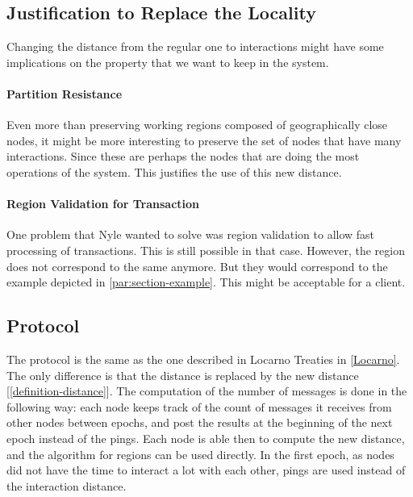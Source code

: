 \documentclass[a4paper,11pt,twoside,openright]{report}
\begin{document}
\subsection{Justification to Replace the Locality}
Changing the distance from the regular one to interactions might have some
implications on the property that we want to keep in the system. 

\paragraph{Partition Resistance}
Even more than preserving working regions
composed of geographically close nodes, it might be more interesting to preserve
the set of nodes that have many interactions. Since these are perhaps the nodes that are doing the most operations of the system. This justifies the use of
this new distance.

\paragraph{Region Validation for Transaction}
One problem that Nyle wanted to solve was region validation to allow fast
processing of transactions. This is still possible in that case. However, the
region does not correspond to the same anymore. But they would correspond to
the example depicted in \autoref{par:section-example}. This might be acceptable
for a client. 

\subsection{Protocol}
The protocol is the same as the one described in Locarno Treaties in
\autoref{Locarno}. The only difference is that the distance is replaced by the
new distance [\autoref{definition-distance}]. The computation of the number of
messages is done in the following way: each node keeps track of the count
of messages it receives from other nodes between epochs, and post the results
at the beginning of the next epoch instead of the pings. Each node is able then
to compute the new distance, and the algorithm for regions can be used
directly. In the first epoch, as nodes did not have the time to interact a lot
with each other, pings are used instead of the interaction distance.
\end{document}
